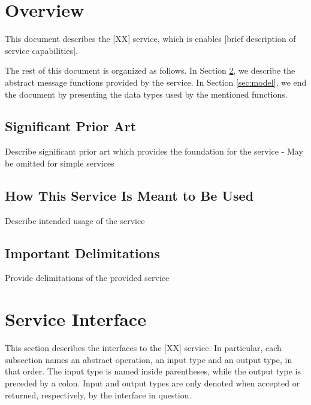 \documentclass[a4paper]{arrowhead}
\begin{document}
\section{Overview}
\label{sec:overview}
\color{red}
This document describes the [XX] service, which is enables [brief description of service capabilities]. 

The rest of this document is organized as follows.
In Section \ref{sec:functions}, we describe the abstract message functions provided by the service.
In Section \ref{sec:model}, we end the document by presenting the data types used by the mentioned functions.
\color{black}

\newpage

\subsection{Significant Prior Art}

\color{red} Describe significant prior art which provides the
foundation for the service - May be omitted for simple services \color{black}  

\subsection{How This Service Is Meant to Be Used}
\color{red} Describe intended usage of the service \color{black}  


\subsection{Important Delimitations}
\label{sec:delimitations}

\color{red} Provide delimitations of the provided service \color{black}  



\newpage

\section{Service Interface}
\label{sec:functions}

\color{red}
This section describes the interfaces to the [XX] service.
In particular, each subsection names an abstract operation, an input type and an output type, in that order.
The input type is named inside parentheses, while the output type is preceded by a colon.
Input and output types are only denoted when accepted or returned, respectively, by the interface in question.
\end{document}
